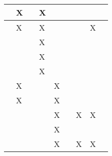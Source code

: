 \begin{longtable}{|l|llllllll|}
    \cite[]{Brockman.2016}        & \multicolumn{1}{l|}{X}   & \multicolumn{1}{l|}{}    & \multicolumn{1}{l|}{X}   & \multicolumn{1}{l|}{}   & \multicolumn{1}{l|}{}   & \multicolumn{1}{l|}{}   & \multicolumn{1}{l|}{}     &    \\ \hline
    \cite[]{YanDuan.2016}         & \multicolumn{1}{l|}{X}   & \multicolumn{1}{l|}{}    & \multicolumn{1}{l|}{X}   & \multicolumn{1}{l|}{}   & \multicolumn{1}{l|}{}   & \multicolumn{1}{l|}{}   & \multicolumn{1}{l|}{X}     &    \\ \hline
    \cite[]{Ivaldi.2272014}       & \multicolumn{1}{l|}{}   & \multicolumn{1}{l|}{}    & \multicolumn{1}{l|}{X}   & \multicolumn{1}{l|}{}   & \multicolumn{1}{l|}{}   & \multicolumn{1}{l|}{}   & \multicolumn{1}{l|}{}     &    \\ \hline
    \cite[]{Ayala.2020}           & \multicolumn{1}{l|}{}   & \multicolumn{1}{l|}{}    & \multicolumn{1}{l|}{X}   & \multicolumn{1}{l|}{}   & \multicolumn{1}{l|}{}   & \multicolumn{1}{l|}{}   & \multicolumn{1}{l|}{}     &    \\ \hline
    \cite[]{Todorov.2012}         & \multicolumn{1}{l|}{}   & \multicolumn{1}{l|}{}    & \multicolumn{1}{l|}{X}   & \multicolumn{1}{l|}{}   & \multicolumn{1}{l|}{}   & \multicolumn{1}{l|}{}   & \multicolumn{1}{l|}{}     &    \\ \hline
    \cite[]{Koch.2018}            & \multicolumn{1}{l|}{X}   & \multicolumn{1}{l|}{}    & \multicolumn{1}{l|}{}   & \multicolumn{1}{l|}{X}   & \multicolumn{1}{l|}{}   & \multicolumn{1}{l|}{}   & \multicolumn{1}{l|}{}     &    \\ \hline
    \cite[]{Deshpande.2020}       & \multicolumn{1}{l|}{X}   & \multicolumn{1}{l|}{}    & \multicolumn{1}{l|}{}   & \multicolumn{1}{l|}{X}   & \multicolumn{1}{l|}{}   & \multicolumn{1}{l|}{}   & \multicolumn{1}{l|}{}     &    \\ \hline
    \cite[]{Deshpande.2021}       & \multicolumn{1}{l|}{}   & \multicolumn{1}{l|}{}    & \multicolumn{1}{l|}{}   & \multicolumn{1}{l|}{X}   & \multicolumn{1}{l|}{}   & \multicolumn{1}{l|}{X}   & \multicolumn{1}{l|}{X}     &    \\ \hline
    \cite[]{Hentati.2018}         & \multicolumn{1}{l|}{}   & \multicolumn{1}{l|}{}    & \multicolumn{1}{l|}{}   & \multicolumn{1}{l|}{X}   & \multicolumn{1}{l|}{}   & \multicolumn{1}{l|}{}   & \multicolumn{1}{l|}{}     &    \\ \hline
    \cite[]{Molchanov.2019}       & \multicolumn{1}{l|}{}   & \multicolumn{1}{l|}{}    & \multicolumn{1}{l|}{}   & \multicolumn{1}{l|}{X}   & \multicolumn{1}{l|}{}   & \multicolumn{1}{l|}{X}   & \multicolumn{1}{l|}{X}     &    \\ \hline

\end{longtable}
